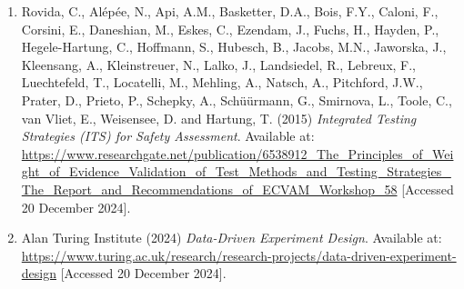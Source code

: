 \documentclass{article}
\begin{document}
\begin{enumerate}
        \item Rovida, C., Alépée, N., Api, A.M., Basketter, D.A., Bois, F.Y., Caloni, F., Corsini, E., Daneshian, M., Eskes, C., Ezendam, J., Fuchs, H., Hayden, P., Hegele-Hartung, C., Hoffmann, S., Hubesch, B., Jacobs, M.N., Jaworska, J., Kleensang, A., Kleinstreuer, N., Lalko, J., Landsiedel, R., Lebreux, F., Luechtefeld, T., Locatelli, M., Mehling, A., Natsch, A., Pitchford, J.W., Prater, D., Prieto, P., Schepky, A., Schüürmann, G., Smirnova, L., Toole, C., van Vliet, E., Weisensee, D. and Hartung, T. (2015) \textit{Integrated Testing Strategies (ITS) for Safety Assessment}. Available at: \url{https://www.researchgate.net/publication/6538912_The_Principles_of_Weight_of_Evidence_Validation_of_Test_Methods_and_Testing_Strategies_The_Report_and_Recommendations_of_ECVAM_Workshop_58} [Accessed 20 December 2024].
        
        \item Alan Turing Institute (2024) \textit{Data-Driven Experiment Design}. Available at: \url{https://www.turing.ac.uk/research/research-projects/data-driven-experiment-design} [Accessed 20 December 2024].


        
        
                
        
        
        
    \end{enumerate}
\end{document}
